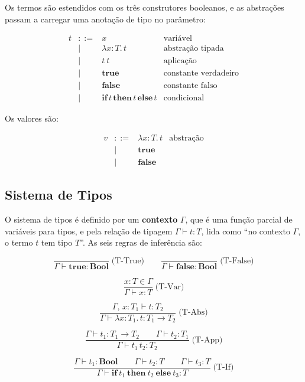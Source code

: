 Os termos são estendidos com os três construtores booleanos, e as
abstrações passam a carregar uma anotação de tipo no parâmetro:

\[
  \begin{array}{rcll} t & ::= & x & \text{variável} \\ & | & \lambda x {:}
    T.\, t & \text{abstração tipada} \\ & | & t\ t & \text{aplicação} \\ & | &
    \mathbf{true} & \text{constante verdadeiro} \\ & | & \mathbf{false} &
    \text{constante falso} \\ & | & \mathbf{if}\, t\, \mathbf{then}\, t\,
    \mathbf{else}\, t & \text{condicional}
\end{array} \]

Os valores são:

\[
  \begin{array}{rcll} v & ::= & \lambda x {:} T.\, t & \text{abstração} \\
    & | & \mathbf{true} & \\ & | & \mathbf{false} &
\end{array} \]

\subsection{Sistema de Tipos}

O sistema de tipos é definido por um \textbf{contexto} \(\Gamma\),
que é uma função parcial de variáveis para tipos, e pela relação de
tipagem \(\Gamma \vdash t : T\), lida como
``no contexto \(\Gamma\), o termo \(t\) tem tipo \(T\)''. As seis
regras de inferência são:

\[ \dfrac{}{\Gamma \vdash \mathbf{true} : \mathbf{Bool}} \;\text{(T-True)}
  \qquad \dfrac{}{\Gamma \vdash \mathbf{false} : \mathbf{Bool}}
\;\text{(T-False)} \]

\[ \dfrac{x : T \in \Gamma}{\Gamma \vdash x : T} \;\text{(T-Var)} \]

\[ \dfrac{\Gamma,\, x : T_1 \vdash t : T_2} {\Gamma \vdash \lambda x {:}
T_1.\, t : T_1 \to T_2} \;\text{(T-Abs)} \]

\[ \dfrac{\Gamma \vdash t_1 : T_1 \to T_2 \qquad \Gamma \vdash t_2 : T_1}
{\Gamma \vdash t_1\, t_2 : T_2} \;\text{(T-App)} \]

\[ \dfrac{ \Gamma \vdash t_1 : \mathbf{Bool} \qquad \Gamma \vdash t_2 : T
  \qquad \Gamma \vdash t_3 : T }{ \Gamma \vdash \mathbf{if}\ t_1\ \mathbf{then}\
t_2\ \mathbf{else}\ t_3 : T } \;\text{(T-If)} \]

